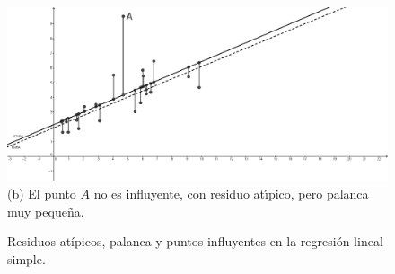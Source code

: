\begin{figure}[p]
\begin{center}
\begin{bn}
\includegraphics[width=13cm]{../fig/Cap10-PuntosInfluyentesRegresion-02-bn.png}\\[3mm]
(b) El punto $A$ no es influyente, con residuo at\'{\i}pico, pero palanca muy peque\~na.\\[3mm]
\end{bn}
\caption{Residuos atípicos, palanca y puntos influyentes en la regresión lineal simple.}
\label{cap10:fig:ResiduosAtipicosPuntosInfluyentes}
\end{center}
\end{figure}
\addtocounter{figure}{-1}

